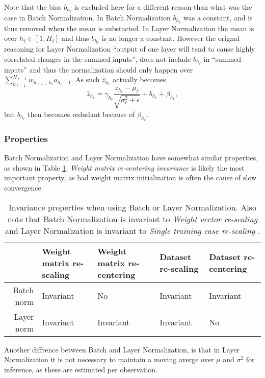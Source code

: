 Note that the bias $b_{h_\ell}$ is excluded here for a different reason than what was the case in Batch Normalization. In Batch Normalization $b_{h_\ell}$ was a constant, and is thus removed when the mean is substacted. In Layer Normalization the mean is over $h_\ell \in [1, H_\ell]$ and thus $b_{h_\ell}$ is no longer a constant. However the orignal reasoning for Layer Normalization ``output of one layer will tend to cause highly correlated changes in the summed inputs'', does not include $b_{h_\ell}$ in ``summed inputs'' and thus the normalization should only happen over $\sum_{h_{\ell-1}}^{H_{\ell-1}} w_{h_{\ell-1},h_\ell} a_{h_\ell-1}$. As such $\hat{z}_{h_\ell}$ actually becomes
\begin{equation*}
\hat{z}_{h_\ell} = \gamma_{h_\ell} \frac{z_{h_\ell} - \mu_{\ell}}{\sqrt{\sigma_{\ell}^2 + \epsilon}} + b_{h_\ell} + \beta_{h_\ell},
\end{equation*}
but $ b_{h_\ell}$ then becomes redudant because of $\beta_{h_\ell}$.

\subsubsection{Properties}

Batch Normalization and Layer Normalization have somewhat similar properties, as shown in Table \ref{table:convergence:layer-norm:properties}. \textit{Weight matrix re-centering invariance} is likely the most important property, as bad weight matrix initialization is often the cause of slow convergence. 

\begin{table}[H]
\centering
\begin{tabular}{r|p{2cm} p{2cm} p{2cm} p{2cm}}
	           & Weight matrix re-scaling & Weight matrix re-centering & Dataset re-scaling& Dataset re-centering \\ \hline
	Batch norm & Invariant & No & Invariant & Invariant \\
	Layer norm & Invariant & Invariant & Invariant & No \\
\end{tabular}
\caption{Invariance properties when using Batch or Layer Normalization. Also note that Batch Normalization is invariant to \textit{Weight vector re-scaling} and Layer Normalization is invariant to \textit{Single training case re-scaling} \cite{layer-normalization}.}
\label{table:convergence:layer-norm:properties}
\end{table}

Another diffrence between Batch and Layer Normalization, is that in Layer Normalization it is not necessary to maintain a moving averge over $\mu$ and $\sigma^2$ for inference, as these are estimated per observation.


